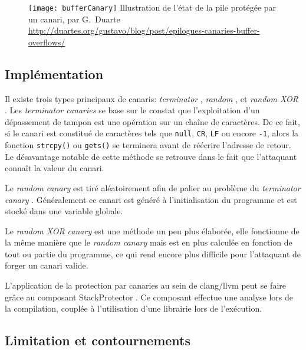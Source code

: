 \begin{figure}[H]
	\centering
	\texttt{[image: bufferCanary]}
	{Illustration de l'état de la pile protégée par un canari, par G.~Duarte}
	{\url{http://duartes.org/gustavo/blog/post/epilogues-canaries-buffer-overflows/}}
	\label{fig:bufferCanary}
\end{figure}

\subsection{Implémentation}

Il existe trois types principaux de canaris: \og \textit{terminator} \fg, \og \textit{random} \fg, et \og \textit{random XOR} \fg \cite{BufferOverflowProtection}. Les \og \textit{terminator canaries} \fg se base sur le constat que l'exploitation d'un dépassement de tampon est une opération sur un chaîne de caractères. De ce fait, si le canari est constitué de caractères tels que \texttt{null}, \texttt{CR}, \texttt{LF} ou encore \texttt{-1}, alors la fonction \texttt{strcpy()} ou \texttt{gets()} se terminera avant de réécrire l'adresse de retour. Le désavantage notable de cette méthode se retrouve dans le fait que l'attaquant connaît la valeur du canari.

Le \og \textit{random canary} \fg est tiré aléatoirement afin de palier au problème du \og \textit{terminator canary} \fg. Généralement ce canari est généré à l'initialisation du programme et est stocké dans une variable globale.

Le \og \textit{random XOR canary} \fg est une méthode un peu plus élaborée, elle fonctionne de la même manière que le \og \textit{random canary} \fg mais est en plus calculée en fonction de tout ou partie du programme, ce qui rend encore plus difficile pour l'attaquant de forger un canari valide.

L'application de la protection par canaries au sein de \gls{clang}/\gls{llvm} peut se faire grâce au composant \og StackProtector \fg \cite{LLVMStackProtector}. Ce composant effectue une analyse lors de la compilation, couplée à l'utilisation d'une librairie lors de l'exécution.

\subsection{Limitation et contournements}

